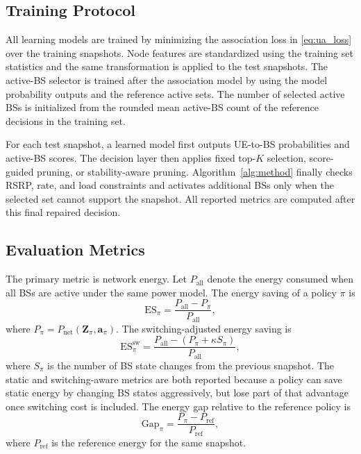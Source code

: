 \documentclass[journal]{IEEEtran}
\begin{document}
\subsection{Training Protocol}
All learning models are trained by minimizing the association loss in
\eqref{eq:ua_loss} over the training snapshots. Node features are standardized
using the training set statistics and the same transformation is applied to the
test snapshots. The active-BS selector is trained after the association model by
using the model probability outputs and the reference active sets. The number
of selected active BSs is initialized from the rounded mean active-BS count of
the reference decisions in the training set.

For each test snapshot, a learned model first outputs UE-to-BS probabilities
and active-BS scores. The decision layer then applies fixed top-$K$ selection,
score-guided pruning, or stability-aware pruning. Algorithm~\ref{alg:method}
finally checks RSRP, rate, and load constraints and activates additional BSs
only when the selected set cannot support the snapshot. All reported metrics
are computed after this final repaired decision.

\subsection{Evaluation Metrics}
The primary metric is network energy. Let
$P_{\mathrm{all}}$ denote the energy consumed when all BSs are active under the
same power model. The energy saving of a policy $\pi$ is
\begin{equation}
    \mathrm{ES}_{\pi}
    =
    \frac{P_{\mathrm{all}}-P_{\pi}}{P_{\mathrm{all}}},
    \label{eq:energy_saving_metric}
\end{equation}
where $P_{\pi}=P_{\mathrm{net}}(\mathbf{Z}_{\pi},\mathbf{a}_{\pi})$. The
switching-adjusted energy saving is
\begin{equation}
    \mathrm{ES}_{\pi}^{\mathrm{sw}}
    =
    \frac{P_{\mathrm{all}}-
    \left(P_{\pi}+\kappa S_{\pi}\right)}
    {P_{\mathrm{all}}},
    \label{eq:switching_saving_metric}
\end{equation}
where $S_{\pi}$ is the number of BS state changes from the previous snapshot.
The static and switching-aware metrics are both reported because a policy can
save static energy by changing BS states aggressively, but lose part of that
advantage once switching cost is included. The
energy gap relative to the reference policy is
\begin{equation}
    \mathrm{Gap}_{\pi}
    =
    \frac{P_{\pi}-P_{\mathrm{ref}}}{P_{\mathrm{ref}}},
    \label{eq:reference_gap_metric}
\end{equation}
where $P_{\mathrm{ref}}$ is the reference energy for the same snapshot.
\end{document}

